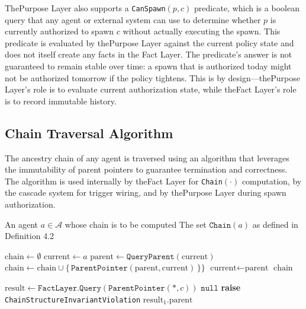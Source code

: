 ThePurpose Layer also supports a \texttt{CanSpawn}$(p, c)$ predicate, which is a boolean query that any agent or external system can use to determine whether $p$ is currently authorized to spawn $c$ without actually executing the spawn. This predicate is evaluated by thePurpose Layer against the current policy state and does not itself create any facts in the Fact Layer. The predicate's answer is not guaranteed to remain stable over time: a spawn that is authorized today might not be authorized tomorrow if the policy tightens. This is by design—thePurpose Layer's role is to evaluate current authorization state, while theFact Layer's role is to record immutable history.

\subsection{Chain Traversal Algorithm}

The ancestry chain of any agent is traversed using an algorithm that leverages the immutability of parent pointers to guarantee termination and correctness. The algorithm is used internally by theFact Layer for \texttt{Chain}$(\cdot)$ computation, by the cascade system for trigger wiring, and by thePurpose Layer during spawn authorization.

\begin{algorithm}[H]
\caption{Chain Traversal Algorithm}
\label{algo:chain-traversal}
\begin{algorithmic}[1]
\Require An agent $a \in \mathcal{A}$ whose chain is to be computed
\Ensure The set $\texttt{Chain}(a)$ as defined in Definition 4.2

\State $\text{chain} \gets \emptyset$
\State $\text{current} \gets a$
\State $\text{parent} \gets \texttt{QueryParent}(\text{current})$
\State $\text{chain} \gets \text{chain} \cup \{\,\texttt{ParentPointer}(\text{parent}, \text{current})\,\}\}$
\State $\text{current} \gets \text{parent}$
\EndWhile
\State \Return $\text{chain}$
\EndFunction

\State $\text{result} \gets \texttt{FactLayer.Query}(\texttt{ParentPointer}(*, c))$
\State {}
\State \Return $\texttt{null}$
\State {}
\State \textbf{raise} \texttt{ChainStructureInvariantViolation}
\Else
\State \Return $\text{result}_1.\text{parent}$
\EndIf
\EndFunction
\end{algorithmic}
\end{algorithm}

